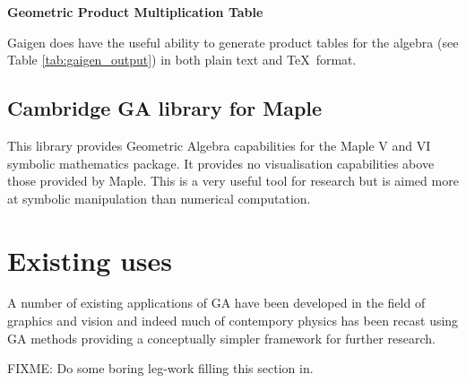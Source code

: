 \begin{table}
\centering
\textbf{Geometric Product Multiplication Table}\\
\rule{0cm}{0.3cm}

\caption{Example \TeX\ output from Gaigen\label{tab:gaigen_output}}
\end{table}

Gaigen does have the useful ability to generate product tables for the algebra
(see Table \ref{tab:gaigen_output}) in both plain text and \TeX\ format. 


\subsection{Cambridge GA library for Maple}

This library\cite{GA:CambridgeGALibrary} provides Geometric Algebra
capabilities for the Maple V and VI symbolic mathematics package. It provides
no visualisation capabilities above those provided by Maple. This is a very
useful tool for research but is aimed more at symbolic manipulation than
numerical computation.

\section{Existing uses}

A number of existing applications of GA have been developed in the
field of graphics and vision\cite{DBLP:conf/giae/WarehamCL04,SahanLasenby} and
indeed much of contempory physics has been recast using GA 
methods\cite{DoranLasenby} providing a conceptually simpler
framework for further research.

FIXME: Do some boring leg-work filling this section in.

